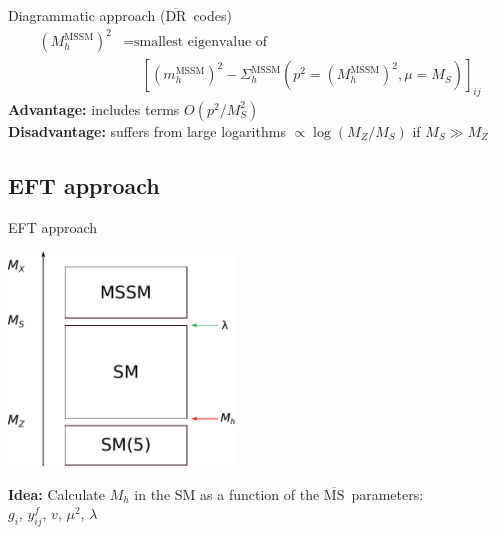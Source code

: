 \documentclass[hyperref={pdfpagelabels=false},ngerman]{beamer}
\renewcommand{\emph}{\textbf}
\newcommand{\DRbar}{\ensuremath{\overline{\text{DR}}}}
\newcommand{\MSbar}{\ensuremath{\overline{\text{MS}}}}
\begin{document}
\begin{frame}{Diagrammatic approach (\DRbar\ codes)}
  \begin{align*}
    (M_h^\text{MSSM})^2 &= \text{smallest eigenvalue of} \\
    &\phantom{={}} \left[(m_h^\text{MSSM})^2 - \Sigma^\text{MSSM}_h(p^2 = (M_h^\text{MSSM})^2,\mu = M_S)\right]_{ij}
  \end{align*}
  \emph{Advantage:} includes terms $O(p^2/M_S^2)$\\
  \emph{Disadvantage:} suffers from large logarithms $\propto\log(M_Z/M_S)$ if $M_S\gg M_Z$\\
\end{frame}


\subsection{EFT approach}

\begin{frame}{EFT approach}
  \begin{center}
    \includegraphics[width=0.45\textwidth]{images/mssm-sm-tower-eft}\\[1em]
  \end{center}
  \emph{Idea:} Calculate $M_h$ in the SM as a function of the \MSbar\ parameters:\\[1em]
  \centering $g_i$, $y^f_{ij}$, $v$, $\mu^2$, $\lambda$
\end{frame}
\end{document}

